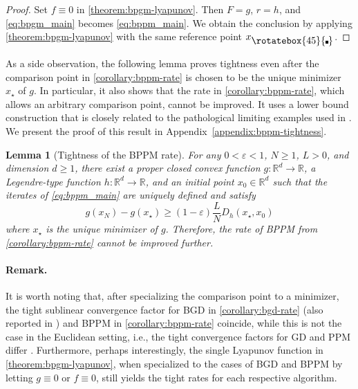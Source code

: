 \documentclass{article}
\theoremstyle{definition}
\theoremstyle{plain}
\newtheorem{lemma}{Lemma}
\newcommand{\reals}{\mathbb{R}}
\newcommand{\compidx}{%
  \mathord{\mathchoice
    {\vcenter{\hbox{\rotatebox{45}{\rule{0.39em}{0.39em}}}}}
    {\vcenter{\hbox{\rotatebox{45}{\rule{0.39em}{0.39em}}}}}
    {\vcenter{\hbox{\rotatebox{45}{\rule{0.29em}{0.29em}}}}}
    {\vcenter{\hbox{\rotatebox{45}{\rule{0.23em}{0.23em}}}}}}%
}
\newcommand{\bregsm}{f}
\newcommand{\bregprox}{g}
\newcommand{\bregaux}{r}
\begin{document}
\begin{proof}
Set $\bregsm\equiv0$ in \cref{theorem:bpgm-lyapunov}.
Then $F=\bregprox$, $\bregaux=h$, and \eqref{eq:bpgm_main} becomes \eqref{eq:bppm_main}.
We obtain the conclusion by applying \cref{theorem:bpgm-lyapunov} with the same reference point $x_{\compidx}$.
\end{proof}

As a side observation, the following lemma proves tightness even after the comparison point in \cref{corollary:bppm-rate} is chosen to be the unique minimizer $x_\star$ of $\bregprox$.
In particular, it also shows that the rate in \cref{corollary:bppm-rate}, which allows an arbitrary comparison point, cannot be improved.
It uses a lower bound construction that is closely related to the pathological limiting examples used in \cite{dragomirOptimalComplexityCertification2022}. 
We present the proof of this result in Appendix~\ref{appendix:bppm-tightness}.

\begin{lemma}[Tightness of the BPPM rate]
\label{lemma:bppm-tightness}
For any $0<\varepsilon<1$, $N\ge1$, $L>0$, and dimension $d\ge1$, there exist a proper closed convex function $\bregprox:\reals^d\to\reals$, a Legendre-type function $h:\reals^d\to\reals$, and an initial point $x_0\in\reals^d$ such that the iterates of \ref{eq:bppm_main} are uniquely defined and satisfy
\[
    \bregprox(x_N)-\bregprox(x_\star)
    \ge (1-\varepsilon)\frac{L}{N}D_h(x_\star,x_0) 
\]
where $x_\star$ is the unique minimizer of $\bregprox$.
Therefore, the rate of BPPM from \cref{corollary:bppm-rate} 
cannot be improved further.
\end{lemma}

\paragraph{Remark.}
It is worth noting that, after specializing the comparison point to a minimizer, the tight sublinear convergence factor for BGD in \cref{corollary:bgd-rate} (also reported in \cite{dragomirOptimalComplexityCertification2022}) and BPPM in \cref{corollary:bppm-rate} coincide, while this is not the case in the Euclidean setting, i.e., the tight convergence factors for GD and PPM differ \citep{TeboulleVaisbourd2023_elementary}.
Furthermore, perhaps interestingly, the single Lyapunov function in \cref{theorem:bpgm-lyapunov}, when specialized to the cases of BGD and BPPM by letting $\bregprox\equiv 0$ or $\bregsm\equiv 0$, still yields the tight rates for each respective algorithm.
\end{document}
